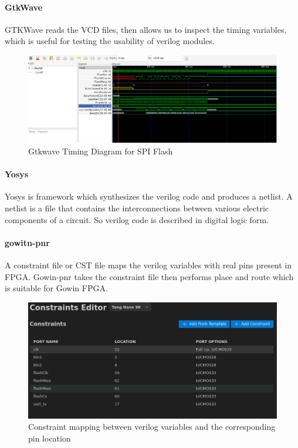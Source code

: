 \documentclass[a4paper,12pt]{article}
\begin{document}
    \paragraph{GtkWave}
    GTKWave reads the VCD files, then allows us to inspect the timing variables, which is useful for testing the usability of verilog modules.
     \begin{figure}[H]
        \centering
        \includegraphics[width=1\textwidth ]{./images/gtkwave.png}
        \caption{Gtkwave Timing Diagram for SPI Flash}
    \end{figure}
    \paragraph{Yosys}
    Yosys is framework which synthesizes the verilog code and produces a netlist. A netlist is a file that contains the interconnections between various electric components of a circuit. So verilog code is described in digital logic form.
    \paragraph{gowitn-pnr}
    A constraint file or CST file maps the verilog variables with real pins present in FPGA. Gowin-pnr takes the constraint file then performs place and route which is suitable for Gowin FPGA.    
     \begin{figure}[H]
        \centering
        \includegraphics[width=1\textwidth ]{./images/constraint.png}
        \caption{Constraint mapping between verilog variables and the corresponding pin location}
    \end{figure}
\end{document}
